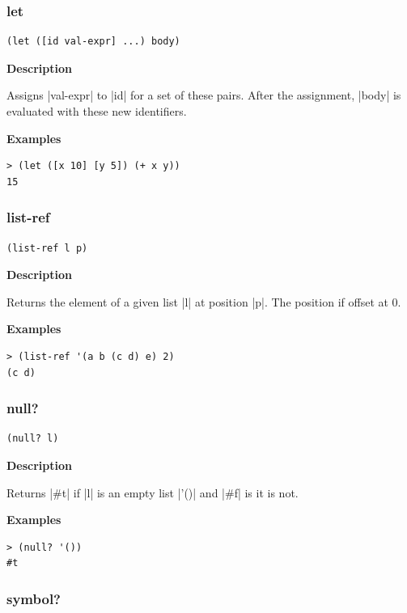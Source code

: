 \documentclass[a4paper]{article}
\begin{document}
\subsubsection{let}

\begin{lstlisting}[frame=none]
(let ([id val-expr] ...) body)
\end{lstlisting}

\textbf{Description}

Assigns |val-expr| to |id| for a set of these pairs. After the assignment, |body| is evaluated with these new identifiers.

\textbf{Examples}

\begin{lstlisting}
> (let ([x 10] [y 5]) (+ x y))
15
\end{lstlisting}

\subsubsection{list-ref}

\begin{lstlisting}[frame=none]
(list-ref l p)
\end{lstlisting}

\textbf{Description}

Returns the element of a given list |l| at position |p|. The position if offset at 0.

\textbf{Examples}

\begin{lstlisting}
> (list-ref '(a b (c d) e) 2)
(c d)
\end{lstlisting}

\subsubsection{null?}

\begin{lstlisting}[frame=none]
(null? l)
\end{lstlisting}

\textbf{Description}

Returns |#t| if |l| is an empty list |'()| and |#f| is it is not.

\textbf{Examples}

\begin{lstlisting}
> (null? '())
#t
\end{lstlisting}

\subsubsection{symbol?}
\end{document}
